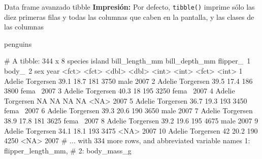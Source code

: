 \documentclass[
  ignorenonframetext,
  aspectratio=169]{beamer}
\newenvironment{Shaded}{\begin{snugshade}}{\end{snugshade}}
\newcommand{\NormalTok}[1]{#1}
\let\oldverbatim\verbatim
\let\endoldverbatim\endverbatim
\renewenvironment{verbatim}{\tiny\oldverbatim}{\endoldverbatim}
\begin{document}
\begin{frame}[fragile]{Data frame avanzado tibble}
\protect\hypertarget{data-frame-avanzado-tibble-5}{}
\textbf{Impresión:} Por defecto, \texttt{tibble()} imprime sólo las diez
primeras filas y todas las columnas que caben en la pantalla, y las
clases de las columnas

\begin{Shaded}
\begin{Highlighting}[]
\NormalTok{penguins}
\end{Highlighting}
\end{Shaded}

\begin{verbatim}
# A tibble: 344 x 8
   species island    bill_length_mm bill_depth_mm flipper_~1 body_~2 sex    year
   <fct>   <fct>              <dbl>         <dbl>      <int>   <int> <fct> <int>
 1 Adelie  Torgersen           39.1          18.7        181    3750 male   2007
 2 Adelie  Torgersen           39.5          17.4        186    3800 fema~  2007
 3 Adelie  Torgersen           40.3          18          195    3250 fema~  2007
 4 Adelie  Torgersen           NA            NA           NA      NA <NA>   2007
 5 Adelie  Torgersen           36.7          19.3        193    3450 fema~  2007
 6 Adelie  Torgersen           39.3          20.6        190    3650 male   2007
 7 Adelie  Torgersen           38.9          17.8        181    3625 fema~  2007
 8 Adelie  Torgersen           39.2          19.6        195    4675 male   2007
 9 Adelie  Torgersen           34.1          18.1        193    3475 <NA>   2007
10 Adelie  Torgersen           42            20.2        190    4250 <NA>   2007
# ... with 334 more rows, and abbreviated variable names 1: flipper_length_mm,
#   2: body_mass_g
\end{verbatim}
\end{frame}
\end{document}
